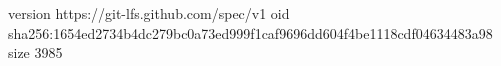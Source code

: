 version https://git-lfs.github.com/spec/v1
oid sha256:1654ed2734b4dc279bc0a73ed999f1caf9696dd604f4be1118cdf04634483a98
size 3985
